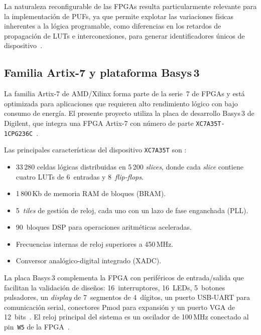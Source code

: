 La naturaleza reconfigurable de las FPGAs resulta particularmente relevante
para la implementación de PUFs, ya que permite explotar las variaciones
físicas inherentes a la lógica programable, como diferencias en los retardos
de propagación de LUTs e interconexiones, para generar identificadores únicos
de dispositivo~\cite{lata_2023_fpgapuf}.

\subsection{Familia Artix-7 y plataforma Basys\,3}
\label{sec:artix7}

La familia Artix-7 de AMD/Xilinx forma parte de la serie~7 de FPGAs y está
optimizada para aplicaciones que requieren alto rendimiento lógico con bajo
consumo de energía. El presente proyecto utiliza la placa de desarrollo
Basys\,3 de Digilent, que integra una FPGA Artix-7 con número de parte
\texttt{XC7A35T-1CPG236C}~\cite{basys3rm}.

Las principales características del dispositivo \texttt{XC7A35T} son
\cite{basys3rm}:

\begin{itemize}
  \item 33\,280 celdas lógicas distribuidas en 5\,200 \textit{slices}, donde
    cada \textit{slice} contiene cuatro LUTs de 6~entradas y
    8~\textit{flip-flops}.
  \item 1\,800\,Kb de memoria RAM de bloques (BRAM).
  \item 5~\textit{tiles} de gestión de reloj, cada uno con un lazo de fase
    enganchada (PLL).
  \item 90~bloques DSP para operaciones aritméticas aceleradas.
  \item Frecuencias internas de reloj superiores a 450\,MHz.
  \item Conversor analógico-digital integrado (XADC).
\end{itemize}

La placa Basys\,3 complementa la FPGA con periféricos de entrada/salida que
facilitan la validación de diseños: 16~interruptores, 16~LEDs, 5~botones
pulsadores, un \textit{display} de 7~segmentos de 4~dígitos, un puerto
USB-UART para comunicación serial, conectores Pmod para expansión y un puerto
VGA de 12~bits~\cite{basys3rm}. El reloj principal del sistema es un
oscilador de 100\,MHz conectado al pin~\texttt{W5} de la
FPGA~\cite{basys3rm}.

